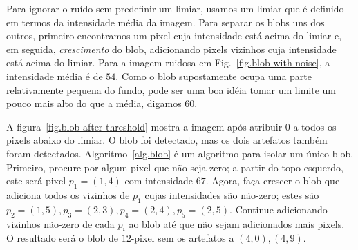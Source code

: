 
Para ignorar o ruído sem predefinir um limiar, usamos um limiar que é definido em termos da intensidade média da imagem. Para separar os blobs uns dos outros, primeiro encontramos um pixel cuja intensidade está acima do limiar e, em seguida, \emph{crescimento} do blob, adicionando pixels vizinhos cuja intensidade está acima do limiar. Para a imagem ruidosa em Fig.~\ref{fig.blob-with-noise}, a intensidade média é de $54$. Como o blob supostamente ocupa uma parte relativamente pequena do fundo, pode ser uma boa idéia tomar um limite um pouco mais alto do que a média, digamos $60$.

A figura~\ref{fig.blob-after-threshold} mostra a imagem após atribuir $0$ a todos os pixels abaixo do limiar. O blob foi detectado, mas os dois artefatos também foram detectados. Algoritmo~\ref{alg.blob} é um algoritmo para isolar um único blob. Primeiro, procure por algum pixel que não seja zero; a partir do topo esquerdo, este será pixel $p_1=(1,4)$ com intensidade $67$. Agora, faça crescer o blob que adiciona todos os vizinhos de $p_1$ cujas intensidades são não-zero; estes são $p_2=(1,5), p_3=(2,3), p_4=(2,4), p_5=(2,5)$. Continue adicionando vizinhos não-zero de cada $p_i$ ao blob até que não sejam adicionados mais pixels. O resultado será o blob de $12$-pixel sem os artefatos a $(4,0), (4,9)$.

